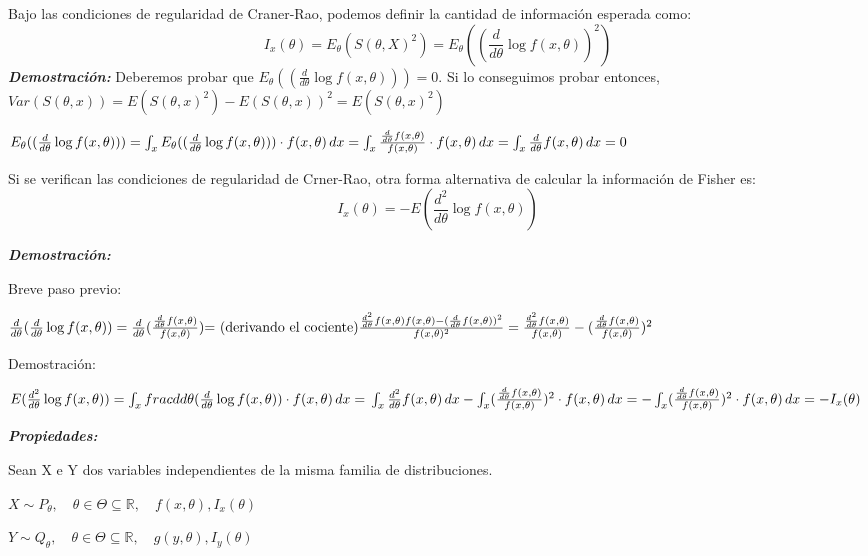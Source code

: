 Bajo las condiciones de regularidad de Craner-Rao, podemos definir la cantidad
de información esperada como:
\[
I_x(\theta)=E_\theta(S(\theta,X)^2)=E_\theta((\frac{d}{d \theta} \log f(x,\theta))^2)
\]
\textbf{\textit{Demostración:}}
Deberemos probar que $E_\theta((\frac{d}{d \theta} \log f(x,\theta)))=0$.
Si lo conseguimos probar entonces, $Var(S(\theta,x))=E(S(\theta,x)^2)
-E(S(\theta,x))^2=E(S(\theta,x)^2)$

\(
    E_\theta((\frac{d}{d \theta} \log f(x,\theta)))=
    \int_{x} E_\theta((\frac{d}{d \theta} \log f(x,\theta))) \cdot f(x,\theta) \,dx 
    =\int_{x} \frac{\frac{d}{d \theta} f(x,\theta)}{f(x,\theta)} \cdot f(x,\theta) \,dx 
    \\=\int_{x} \frac{d}{d \theta} f(x,\theta) \,dx = 0
\)

Si se verifican las condiciones de regularidad de Crner-Rao, otra forma alternativa de calcular
la información de Fisher es:
\[
I_x(\theta)=-E(\frac{d^2}{d \theta} \log f(x,\theta))
\]

\textbf{\textit{Demostración:}}

Breve paso previo:


\(
\frac{d}{d \theta} (\frac{d}{d \theta} \log f(x,\theta))=
\frac{d}{d \theta} (\frac{\frac{d}{d \theta} f(x,\theta)}{f(x,\theta)})
\text{= (derivando el cociente)}
\frac{\frac{d^2}{d \theta} f(x,\theta) f(x,\theta) - (\frac{d}{d \theta} f(x,\theta))^2}{f(x,\theta)^2}
\\ = \frac{\frac{d^2}{d \theta} f(x,\theta)}{f(x,\theta)} - (\frac{\frac{d}{d \theta} f(x,\theta)}{f(x,\theta)})^2
\)

Demostración:

\(
E(\frac{d^2}{d \theta} \log f(x,\theta))=
\int_{x} frac{d}{d \theta} (\frac{d}{d \theta} \log f(x,\theta)) \cdot f(x,\theta) \,dx = \\
\int_{x} \frac{d^2}{d \theta} f(x, \theta) \,dx - \int_{x} (\frac{\frac{d}{d \theta} f(x,\theta)}{f(x,\theta)})^2 \cdot f(x,\theta) \,dx  
= - \int_{x} (\frac{\frac{d}{d \theta} f(x,\theta)}{f(x,\theta)})^2 \cdot f(x,\theta) \,dx  
= - I_x(\theta)
\)

\textbf{\textit{Propiedades:}}

Sean X e Y dos variables independientes de la misma familia de distribuciones.

$
X \sim P_\theta, \quad \theta \in \Theta \subseteq \mathbb{R}, \quad f(x,\theta), I_x(\theta)
$

$
Y \sim Q_\theta, \quad \theta \in \Theta \subseteq \mathbb{R}, \quad g(y,\theta), I_y(\theta)
$


